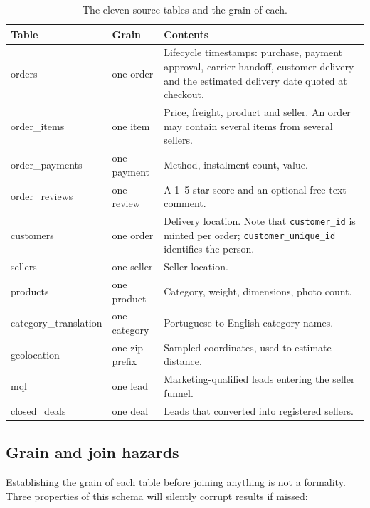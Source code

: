 \documentclass[11pt,a4paper]{article}
\begin{document}
\begin{table}[H]
\centering
\small
\caption{The eleven source tables and the grain of each.}
\label{tab:tables}
\begin{tabular}{@{}p{3.1cm}p{2.0cm}p{9.4cm}@{}}
\toprule
\textbf{Table} & \textbf{Grain} & \textbf{Contents}\\
\midrule
orders & one order & Lifecycle timestamps: purchase, payment approval, carrier
handoff, customer delivery and the estimated delivery date quoted at checkout.\\
order\_items & one item & Price, freight, product and seller. An order may contain
several items from several sellers.\\
order\_payments & one payment & Method, instalment count, value.\\
order\_reviews & one review & A 1--5 star score and an optional free-text comment.\\
customers & one order & Delivery location. Note that \texttt{customer\_id} is minted
per order; \texttt{customer\_unique\_id} identifies the person.\\
sellers & one seller & Seller location.\\
products & one product & Category, weight, dimensions, photo count.\\
category\_translation & one category & Portuguese to English category names.\\
geolocation & one zip prefix & Sampled coordinates, used to estimate distance.\\
mql & one lead & Marketing-qualified leads entering the seller funnel.\\
closed\_deals & one deal & Leads that converted into registered sellers.\\
\bottomrule
\end{tabular}
\end{table}

\subsection{Grain and join hazards}

Establishing the grain of each table before joining anything is not a formality.
Three properties of this schema will silently corrupt results if missed:
\end{document}
